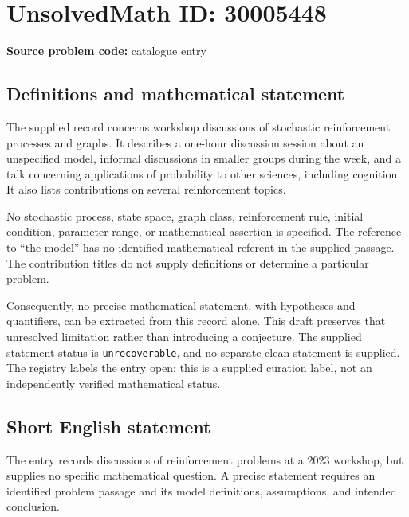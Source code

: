 \documentclass[11pt]{article}
\begin{document}
\section*{UnsolvedMath ID: 30005448}
\textbf{Source problem code:} catalogue entry
\subsection{Definitions and mathematical statement}
The supplied record concerns workshop discussions of stochastic reinforcement processes and graphs. It describes a one-hour discussion session about an unspecified model, informal discussions in smaller groups during the week, and a talk concerning applications of probability to other sciences, including cognition. It also lists contributions on several reinforcement topics.

No stochastic process, state space, graph class, reinforcement rule, initial condition, parameter range, or mathematical assertion is specified. The reference to ``the model'' has no identified mathematical referent in the supplied passage. The contribution titles do not supply definitions or determine a particular problem.

Consequently, no precise mathematical statement, with hypotheses and quantifiers, can be extracted from this record alone. This draft preserves that unresolved limitation rather than introducing a conjecture. The supplied statement status is \texttt{unrecoverable}, and no separate clean statement is supplied. The registry labels the entry open; this is a supplied curation label, not an independently verified mathematical status.
\subsection{Short English statement}
The entry records discussions of reinforcement problems at a 2023 workshop, but supplies no specific mathematical question. A precise statement requires an identified problem passage and its model definitions, assumptions, and intended conclusion.
\end{document}
